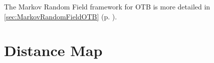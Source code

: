 The Markov Random Field framework for OTB is more detailed in \ref{sec:MarkovRandomFieldOTB} (p. \pageref{sec:MarkovRandomFieldOTB}).

\ifitkFullVersion

\fi

\section{Distance Map}
\label{sec:DistanceMap}

\ifitkFullVersion

\fi




%










